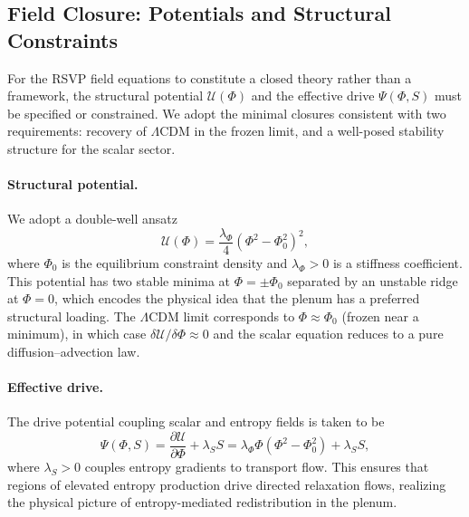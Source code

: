 \documentclass[12pt,a4paper]{article}
\theoremstyle{remark}
\begin{document}
\subsection{Field Closure: Potentials and Structural Constraints}

For the RSVP field equations to constitute a closed theory rather than a
framework, the structural potential $\mathcal{U}(\Phi)$ and the effective drive
$\Psi(\Phi, S)$ must be specified or constrained. We adopt the minimal closures
consistent with two requirements: recovery of $\Lambda$CDM in the frozen limit,
and a well-posed stability structure for the scalar sector.

\paragraph{Structural potential.}
We adopt a double-well ansatz
\begin{equation}
\mathcal{U}(\Phi) = \frac{\lambda_\Phi}{4}(\Phi^2 - \Phi_0^2)^2,
\label{eq:U}
\end{equation}
where $\Phi_0$ is the equilibrium constraint density and $\lambda_\Phi > 0$
is a stiffness coefficient. This potential has two stable minima at
$\Phi = \pm\Phi_0$ separated by an unstable ridge at $\Phi = 0$, which encodes
the physical idea that the plenum has a preferred structural loading. The
$\Lambda$CDM limit corresponds to $\Phi \approx \Phi_0$ (frozen near a minimum),
in which case $\delta\mathcal{U}/\delta\Phi \approx 0$ and the scalar equation
reduces to a pure diffusion--advection law.

\paragraph{Effective drive.}
The drive potential coupling scalar and entropy fields is taken to be
\begin{equation}
\Psi(\Phi, S) = \frac{\partial \mathcal{U}}{\partial \Phi} + \lambda_S S
= \lambda_\Phi \Phi(\Phi^2 - \Phi_0^2) + \lambda_S S,
\label{eq:Psi}
\end{equation}
where $\lambda_S > 0$ couples entropy gradients to transport flow. This
ensures that regions of elevated entropy production drive directed relaxation
flows, realizing the physical picture of entropy-mediated redistribution in
the plenum.
\end{document}
